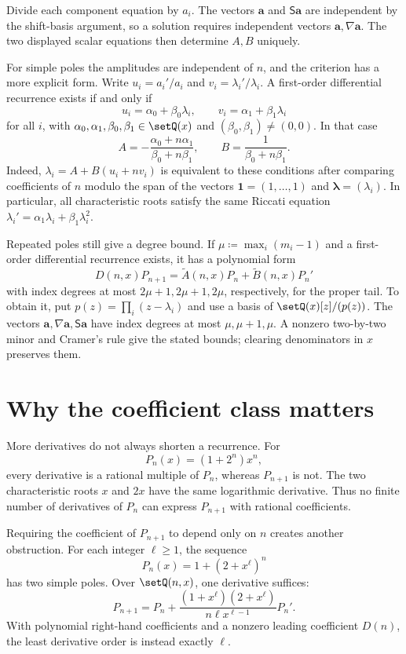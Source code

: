 \begin{proof*}
Divide each component equation by $a_i$.
The vectors $\mathbf{a}$ and $\mathsf S\mathbf{a}$ are independent by the
shift-basis argument, so a solution requires independent vectors
$\mathbf{a},\nabla\mathbf{a}$.
The two displayed scalar equations then determine $A,B$ uniquely.
\end{proof*}

For simple poles the amplitudes are independent of $n$, and the criterion
has a more explicit form. Write $u_i=a_i'/a_i$ and
$v_i=\lambda_i'/\lambda_i$. A first-order differential recurrence exists
if and only if
\[
 u_i=\alpha_0+\beta_0\lambda_i,\qquad
 v_i=\alpha_1+\beta_1\lambda_i
\]
for all $i$, with $\alpha_0,\alpha_1,\beta_0,\beta_1\in\setQ(x)$ and
$(\beta_0,\beta_1)\ne(0,0)$. In that case
\[
 A=-\frac{\alpha_0+n\alpha_1}{\beta_0+n\beta_1},\qquad
 B=\frac{1}{\beta_0+n\beta_1}.
\]
Indeed, $\lambda_i=A+B(u_i+nv_i)$ is equivalent to these conditions after
comparing coefficients of $n$ modulo the span of the vectors
$\mathbf{1}=(1,\dotsc,1)$ and $\boldsymbol{\lambda}=(\lambda_i)$.
In particular, all characteristic roots satisfy the same Riccati equation
$\lambda_i'=\alpha_1\lambda_i+\beta_1\lambda_i^2$.

Repeated poles still give a degree bound. If
$\mu\coloneqq\max_i(m_i-1)$ and a first-order differential recurrence exists,
it has a polynomial form
\[
 D(n,x)P_{n+1}=\widetilde{A}(n,x)P_n+\widetilde{B}(n,x)P_n'
\]
with index degrees at most $2\mu+1,2\mu+1,2\mu$, respectively, for the proper tail.
To obtain it, put $p(z)=\prod_i(z-\lambda_i)$ and use a basis of
$\setQ(x)[z]/(p(z))$. The vectors
$\mathbf{a},\nabla\mathbf{a},\mathsf S\mathbf{a}$ have index degrees at
most $\mu,\mu+1,\mu$. A nonzero two-by-two minor and Cramer's rule give the
stated bounds; clearing denominators in $x$ preserves them.

\section[recurrenceCoefficientRestrictions]{Why the coefficient class matters}

More derivatives do not always shorten a recurrence. For
\[
 P_n(x)=(1+2^n)x^n,
\]
every derivative is a rational multiple of $P_n$, whereas $P_{n+1}$ is not.
The two characteristic roots $x$ and $2x$ have the same logarithmic derivative.
Thus no finite number of derivatives of $P_n$ can express $P_{n+1}$
with rational coefficients.

Requiring the coefficient of $P_{n+1}$ to depend only on $n$ creates another
obstruction. For each integer $\ell\geq1$, the sequence
\[
 P_n(x)=1+(2+x^\ell)^n
\]
has two simple poles. Over $\setQ(n,x)$, one derivative suffices:
\[
 P_{n+1}=P_n+
 \frac{(1+x^\ell)(2+x^\ell)}{n\ell x^{\ell-1}}P_n'.
\]
With polynomial right-hand coefficients and a nonzero leading coefficient
$D(n)$, the least derivative order is instead exactly $\ell$.

